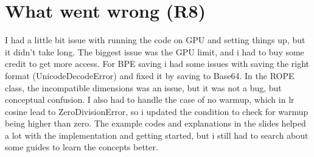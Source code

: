 \documentclass[11pt,a4paper]{article}
\begin{document}
\section{What went wrong (R8)}
I had a little bit issue with running the code on GPU and setting things up, but it didn't take long. The biggest issue was the GPU limit, and i had to buy some credit to get more access.\newline 
For BPE saving i had some issues with saving the right format (UnicodeDecodeError) and fixed it by saving to Base64. In the ROPE class, the incompatible dimensions was an issue, but it was not a bug, but conceptual confusion. I also had to handle the case of no warmup, which in lr cosine lead to ZeroDivisionError, so i updated the condition to check for warmup being higher than zero.\newline
The example codes and explanations in the slides helped a lot with the implementation and getting started, but i still had to search about some guides to learn the concepts better.

\appendix
\end{document}

